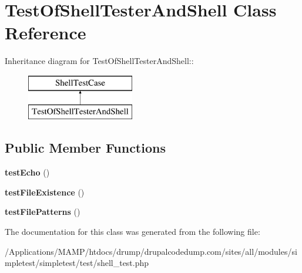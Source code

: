 \hypertarget{class_test_of_shell_tester_and_shell}{
\section{TestOfShellTesterAndShell Class Reference}
\label{class_test_of_shell_tester_and_shell}
}
Inheritance diagram for TestOfShellTesterAndShell::\begin{figure}[H]
\begin{center}
\leavevmode
\includegraphics[height=2cm]{class_test_of_shell_tester_and_shell}
\end{center}
\end{figure}
\subsection*{Public Member Functions}
\begin{DoxyCompactItemize}
\item 
\hypertarget{class_test_of_shell_tester_and_shell_ac3ecdfd23d20356369751f8edd81abf7}{
{\bfseries testEcho} ()}
\label{class_test_of_shell_tester_and_shell_ac3ecdfd23d20356369751f8edd81abf7}

\item 
\hypertarget{class_test_of_shell_tester_and_shell_afa43753cba94d289a75bf3cf9a7a3d38}{
{\bfseries testFileExistence} ()}
\label{class_test_of_shell_tester_and_shell_afa43753cba94d289a75bf3cf9a7a3d38}

\item 
\hypertarget{class_test_of_shell_tester_and_shell_a2eb67b5f7f198bf9f4ae561efc61d9c7}{
{\bfseries testFilePatterns} ()}
\label{class_test_of_shell_tester_and_shell_a2eb67b5f7f198bf9f4ae561efc61d9c7}

\end{DoxyCompactItemize}


The documentation for this class was generated from the following file:\begin{DoxyCompactItemize}
\item 
/Applications/MAMP/htdocs/drump/drupalcodedump.com/sites/all/modules/simpletest/simpletest/test/shell\_\-test.php\end{DoxyCompactItemize}
